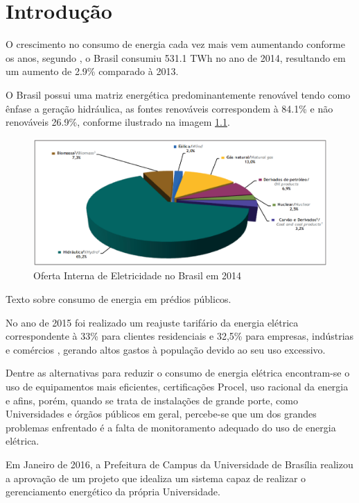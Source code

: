 \chapter{Introdução}
O crescimento no consumo de energia cada vez mais vem aumentando conforme os anos, segundo \cite{balanco_energetico}, o
Brasil consumiu 531.1 TWh no ano de 2014, resultando em um aumento de 2.9\% comparado à 2013.

O Brasil possui uma matriz energética predominantemente renovável tendo como ênfase a geração hidráulica, as fontes renováveis correspondem à 84.1\% e não renováveis 26.9\%, conforme ilustrado na imagem \ref{consumo-2014}.

\begin{figure}[h]
    \centering
    \includegraphics[keepaspectratio=true,scale=0.4]{figuras/consumo_energia_2014.eps}
    \caption{Oferta Interna de Eletricidade no Brasil em 2014}
    \label{consumo-2014}
\end{figure}

Texto sobre consumo de energia em prédios públicos.

No ano de 2015 foi realizado um reajuste tarifário da energia elétrica correspondente à 33\% para clientes residenciais e 32,5\% para empresas, indústrias e comércios
\cite{aumento_energia}, gerando altos gastos à população devido ao seu uso excessivo.

Dentre as alternativas para reduzir o consumo de energia elétrica encontram-se o uso de equipamentos mais eficientes, certificações Procel, uso racional da energia e afins, porém, quando se trata de instalações de grande porte, como Universidades e órgãos públicos em geral, percebe-se que um dos grandes problemas enfrentado é a falta de monitoramento adequado do uso de energia elétrica.

Em Janeiro de 2016, a Prefeitura de Campus da Universidade de Brasília realizou a aprovação de um projeto que
idealiza um sistema capaz de realizar o gerenciamento energético da própria Universidade.

